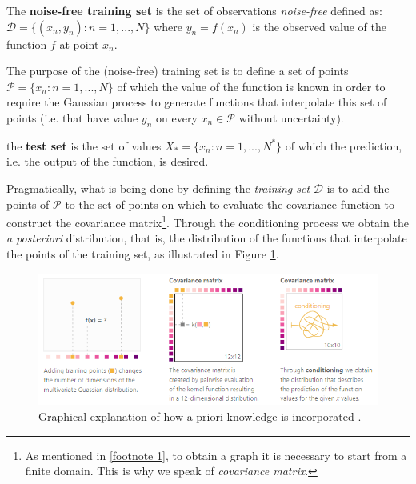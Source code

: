 \begin{defi}
  The \textbf{noise-free training set} is the set of observations \textit{noise-free} defined as: $ \mathcal{D}=\{ (x_n,y_n) : n=1,...,N\}$ where $y_n=f(x_n)$ is the observed value of the function $f$ at point $x_n$. 
\end{defi}


The purpose of the (noise-free) training set is to define a set of points $\mathcal{P}=\{x_n: n=1,...,N\}$ of which the value of the function is known in order to require the Gaussian process to generate functions that interpolate this set of points (i.e. that have value $y_n$ on every $x_n \in \mathcal{P}$ without uncertainty).

\begin{defi}
  the \textbf{test set} is the set of values $X_*=\{x_n:n=1,...,N^*\}$ of which the prediction, i.e. the output of the function, is desired.
\end{defi}

Pragmatically, what is being done by defining the \textit{training set} $\mathcal{D}$ is to add the points of $\mathcal{P}$ to the set of points on which to evaluate the covariance function to construct the covariance matrix\footnote{As mentioned in \ref{footnote 1}, to obtain a graph it is necessary to start from a finite domain. This is why we speak of \textit{covariance matrix}.}. Through the conditioning process we obtain the \textit{a posteriori} distribution, that is, the distribution of the functions that interpolate the points of the training set, as illustrated in Figure \ref{intuitiveExplanationOfConditioning}.


\begin{figure}[h]
    \centering
    \includegraphics[width=1\textwidth]{images/Gaussian process/GPposterior.PNG}
    \caption{Graphical explanation of how a priori knowledge is incorporated \cite{gortler_visual_2019}.}
    \label{intuitiveExplanationOfConditioning}
\end{figure}


